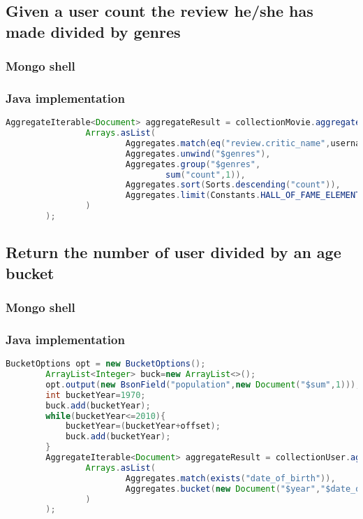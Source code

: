 \subsection{Given a user count the review he/she has made divided by genres}\label{subsec:preferredGenres}
\subsubsection{Mongo shell}

\subsubsection{Java implementation}
\begin{lstlisting}[language=Java]
AggregateIterable<Document> aggregateResult = collectionMovie.aggregate(
                Arrays.asList(
                        Aggregates.match(eq("review.critic_name",username)),
                        Aggregates.unwind("$genres"),
                        Aggregates.group("$genres",
                                sum("count",1)),
                        Aggregates.sort(Sorts.descending("count")),
                        Aggregates.limit(Constants.HALL_OF_FAME_ELEMENT_NUMBERS)
                )
        );
\end{lstlisting}

\subsection{Return the number of user divided by an age bucket}\label{subsec:userPopulationBucket}
\subsubsection{Mongo shell}

\subsubsection{Java implementation}
\begin{lstlisting}[language=Java]
BucketOptions opt = new BucketOptions();
        ArrayList<Integer> buck=new ArrayList<>();
        opt.output(new BsonField("population",new Document("$sum",1)));
        int bucketYear=1970;
        buck.add(bucketYear);
        while(bucketYear<=2010){
            bucketYear=(bucketYear+offset);
            buck.add(bucketYear);
        }
        AggregateIterable<Document> aggregateResult = collectionUser.aggregate(
                Arrays.asList(
                        Aggregates.match(exists("date_of_birth")),
                        Aggregates.bucket(new Document("$year","$date_of_birth"),buck,opt)
                )
        );
\end{lstlisting}

